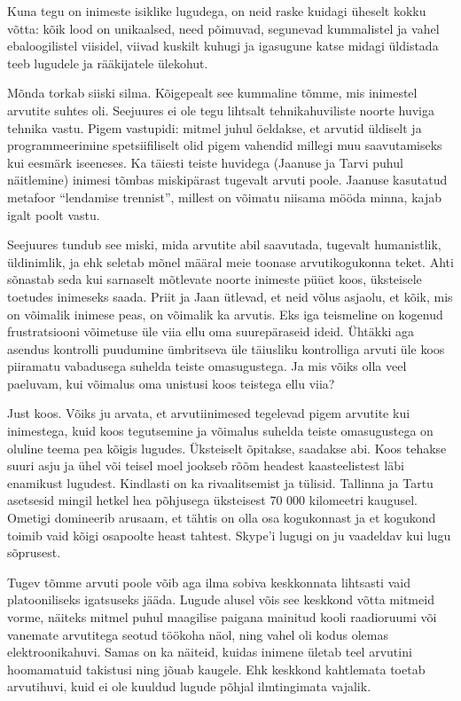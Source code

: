 Kuna tegu on inimeste isiklike lugudega, on neid raske kuidagi üheselt kokku võtta: 
kõik lood on unikaalsed, need põimuvad, segunevad kummalistel ja vahel 
ebaloogilistel viisidel, viivad kuskilt kuhugi ja igasugune katse midagi 
üldistada teeb lugudele ja rääkijatele ülekohut. 

Mõnda torkab siiski silma. Kõigepealt see kummaline tõmme, mis inimestel arvutite suhtes oli. Seejuures 
ei ole tegu lihtsalt tehnikahuviliste noorte huviga tehnika vastu. 
Pigem vastupidi: mitmel juhul öeldakse, et arvutid üldiselt ja programmeerimine 
spetsiifiliselt olid pigem vahendid millegi muu saavutamiseks kui eesmärk 
iseeneses. Ka täiesti teiste huvidega (Jaanuse ja Tarvi puhul näitlemine) 
inimesi tõmbas miskipärast tugevalt arvuti poole. Jaanuse kasutatud metafoor 
\enquote{lendamise trennist}, millest on võimatu niisama mööda minna, kajab 
igalt poolt vastu. 

Seejuures tundub see miski, mida arvutite abil saavutada, tugevalt humanistlik, 
üldinimlik, ja ehk seletab mõnel määral meie toonase arvutikogukonna teket. 
Ahti sõnastab seda kui sarnaselt mõtlevate noorte inimeste püüet koos, 
üksteisele toetudes inimeseks saada. Priit ja Jaan ütlevad, et neid võlus asjaolu, et kõik, mis on võimalik inimese peas, on võimalik ka 
arvutis. Eks iga teismeline on kogenud frustratsiooni võimetuse üle viia 
ellu oma suurepäraseid ideid. Ühtäkki aga asendus kontrolli puudumine 
ümbritseva üle täiusliku kontrolliga arvuti üle koos piiramatu vabadusega 
suhelda teiste omasugustega. Ja mis võiks olla veel paeluvam, kui võimalus oma 
unistusi koos teistega ellu viia?

Just koos. Võiks ju arvata, et arvutiinimesed tegelevad pigem arvutite kui 
inimestega, kuid koos tegutsemine ja võimalus suhelda teiste omasugustega on 
oluline teema pea kõigis lugudes. Üksteiselt õpitakse, saadakse abi. Koos 
tehakse suuri asju ja ühel või teisel moel jookseb rõõm headest kaasteelistest 
läbi enamikust lugudest. Kindlasti on ka rivaalitsemist ja tülisid. Tallinna ja 
Tartu asetsesid mingil hetkel hea põhjusega üksteisest 70 000 kilomeetri 
kaugusel. Ometigi domineerib arusaam, et 
tähtis on olla osa kogukonnast ja et kogukond toimib vaid kõigi osapoolte 
heast tahtest. Skype'i lugugi on ju vaadeldav kui lugu sõprusest.

Tugev tõmme arvuti poole võib aga ilma sobiva keskkonnata lihtsasti vaid 
platooniliseks igatsuseks jääda. Lugude alusel võis see keskkond võtta 
mitmeid vorme, näiteks mitmel puhul maagilise paigana mainitud kooli raadioruumi 
või vanemate arvutitega seotud töökoha näol, ning vahel oli kodus olemas 
elektroonikahuvi. Samas on ka näiteid, kuidas inimene ületab teel arvutini 
hoomamatuid takistusi ning jõuab kaugele. Ehk keskkond kahtlemata toetab 
arvutihuvi, kuid ei ole kuuldud lugude põhjal ilmtingimata vajalik.

